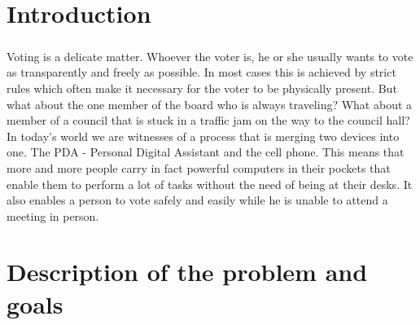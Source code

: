 \documentclass[11pt,twoside,a4paper]{book}
\begin{document}

% 
% 

\chapter{Introduction}

\paragraph*{}
Voting is a delicate matter. Whoever the voter is, he or she usually wants to vote as transparently and freely as possible. In most cases this is achieved by strict rules which often make it necessary for the voter to be physically present. But what about the one member of the board who is always traveling? What about a member of a council that is stuck in a traffic jam on the way to the council hall? \\
In today's world we are witnesses of a process that is merging two devices into one. The PDA - Personal Digital Assistant and the cell phone. This means that more and more people carry in fact powerful computers in their pockets that enable them to perform a lot of tasks without the need of being at their desks. It also enables a person to vote safely and easily while he is unable to attend a meeting in person. 

\chapter{Description of the problem and goals}
\end{document}
